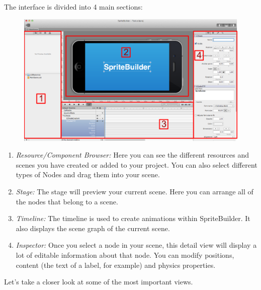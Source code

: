 The \SB{} interface is divided into 4 main sections:
\begin{figure}[H]
		\centering
		\includegraphics[width=0.9\linewidth]{images/spritebuilder/spritebuilder_ui.png}     
\end{figure} 
\begin{enumerate}
  \item \textit{Resource/Component Browser:} Here you can see the different
  resources and scenes you have created or added to your project. You can also select different types of Nodes and drag them into your scene.
  \item \textit{Stage:} The stage will preview your current scene. Here you can
  arrange all of the nodes that belong to a scene. 
  \item \textit{Timeline:} The timeline is used to create animations within
  SpriteBuilder. It also displays the scene graph of the current scene.
  \item \textit{Inspector:} Once you select a node in your scene, this detail
  view will display a lot of editable information about that node. You can modify positions, content (the text of a label, for example) and physics properties.
\end{enumerate}
Let's take a closer look at some of the most important views.

